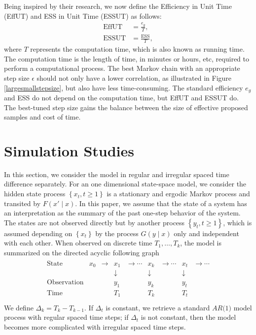 Being inspired by their research, we now define the Efficiency in Unit Time (EffUT)  and ESS in Unit Time (ESSUT) as follows: 
\begin{align}
\mbox{EffUT}   &= \frac{e_g}{T},\\
\mbox{ESSUT} &= \frac{\mbox{ESS}}{T},
\end{align} 
where $T$ represents the computation time, which is also known as running time. The computation time is the length of time, in minutes or hours, etc, required to perform a computational process. The best Markov chain with an appropriate step size $\epsilon$ should not only have a lower correlation, as illustrated in Figure \ref{largesmallstepsize}, but also have less time-consuming. The standard efficiency $e_g$ and ESS do not depend on the computation time, but EffUT and ESSUT do. The best-tuned step size gains the balance between the size of effective proposed samples and cost of time. 




\section{Simulation Studies}

In this section, we consider the model in regular and irregular spaced time difference separately. For an one dimensional state-space model, we consider the hidden state process $\left\lbrace x_t, t\geq 1\right\rbrace$ is a stationary and ergodic Markov process and transited by $F(x'\mid x)$. In this paper, we assume that the state of a system has an interpretation as the summary of the past one-step behavior of the system. The states are not observed directly but by another process $\left\lbrace y_t, t\geq 1\right\rbrace$, which is assumed depending on $\left\lbrace x_t\right\rbrace$ by the process $G(y\mid x)$ only and independent with each other. When observed on discrete time $T_1,\ldots,T_k$, the model is summarized on the directed acyclic following graph  
\begin{align}
\begin{matrix}
\mbox{State}  & x_0     &  \rightarrow& x_1   & \rightarrow \cdots  & x_k  & \rightarrow \cdots & x_t & \rightarrow \cdots\\
          & &       & \downarrow &         &\downarrow &        &\downarrow &   \\
\mbox{Observation}& && y_1               &          & y_k               &        & y_t               &   \\
\mbox{Time } & &       & T_1               &          & T_k               &        & T_t               &   \\
\end{matrix}
\end{align}
We define $\Delta_k = T_k-T_{k-1}$. If $\Delta_t$ is constant, we retrieve a standard  $\textit{AR(1)}$ model process with regular spaced time steps; if $\Delta_t$ is not constant, then the model becomes more complicated with irregular spaced time steps. 

